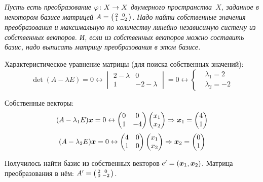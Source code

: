\documentclass[a4paper,12pt]{article}
\begin{document}
  \begin{example}
    \emph{
      Пусть есть преобразование $\phi\colon X \hm\to X$ двумерного пространства~$X$, заданное в некотором базисе матрицей $A \hm= \left(\begin{smallmatrix} 2 & 0 \\ 1 & -2 \end{smallmatrix}\right)$.
      Надо найти собственные значения преобразования и максимальную по количеству линейно независимую систему из собственных векторов.
      И, если из собственных векторов можно составить базис, надо выписать матрицу преобразования в этом базисе.
    }
    
    \bigskip
    
    Характеристическое уравнение матрицы (для поиска собственных значений):
    \[
      \det(A - \lambda E) = 0
      \leftrightarrow \begin{vmatrix}
        2 - \lambda & 0\\
        1 & -2 - \lambda
      \end{vmatrix} = 0
      \leftrightarrow \left\{
        \begin{aligned}
          &\lambda_1 = 2\\
          &\lambda_2 = -2
        \end{aligned}
      \right.
    \]
    
    Собственные векторы:
    \[
      (A - \lambda_1 E) \boldsymbol x = 0 \leftrightarrow \begin{pmatrix}
        0 & 0\\
        1 & -4
      \end{pmatrix} \begin{pmatrix}
        x_1\\
        x_2
      \end{pmatrix} \Rightarrow \boldsymbol x_1 = \begin{pmatrix}
        4\\
        1
      \end{pmatrix}
    \]
    \[
      (A - \lambda_2 E) \boldsymbol x = 0 \leftrightarrow \begin{pmatrix}
        4 & 0\\
        1 & 0
      \end{pmatrix} \begin{pmatrix}
        x_1\\
        x_2
      \end{pmatrix} \Rightarrow \boldsymbol x_2 = \begin{pmatrix}
        0\\
        1
      \end{pmatrix}
    \]
    
    Получилось найти базис из собственных векторов $e' \hm= (\bds x_1, \bds x_2)$.
    Матрица преобразования в нём: $A' \hm= \left(\begin{smallmatrix} 2 & 0\\ 0 & -2 \end{smallmatrix}\right)$.
  \end{example}
  
\end{document}
